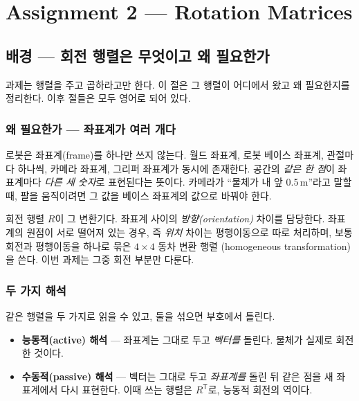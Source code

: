 \chapter{Assignment 2 --- Rotation Matrices}
\label{ch:hw2}


\section{배경 --- 회전 행렬은 무엇이고 왜 필요한가}
\label{sec:hw2-bg}

과제는 행렬을 주고 곱하라고만 한다. 이 절은 그 행렬이 어디에서 왔고 왜 필요한지를
정리한다. 이후 절들은 모두 영어로 되어 있다.

\subsection{왜 필요한가 --- 좌표계가 여러 개다}
\label{sec:hw2-bg-why}

로봇은 좌표계(frame)를 하나만 쓰지 않는다. 월드 좌표계, 로봇 베이스 좌표계, 관절마다
하나씩, 카메라 좌표계, 그리퍼 좌표계가 동시에 존재한다. 공간의 \emph{같은 한 점}이
좌표계마다 \emph{다른 세 숫자}로 표현된다는 뜻이다. 카메라가 ``물체가 내 앞
0.5\,m''라고 말할 때, 팔을 움직이려면 그 값을 베이스 좌표계의 값으로 바꿔야 한다.

회전 행렬 $R$이 그 변환기다. 좌표계 사이의 \emph{방향(orientation)} 차이를 담당한다.
좌표계의 원점이 서로 떨어져 있는 경우, 즉 \emph{위치} 차이는 평행이동으로 따로
처리하며, 보통 회전과 평행이동을 하나로 묶은 $4 \times 4$ 동차 변환 행렬
(homogeneous transformation)을 쓴다. 이번 과제는 그중 회전 부분만 다룬다.

\subsection{두 가지 해석}
\label{sec:hw2-bg-two}

같은 행렬을 두 가지로 읽을 수 있고, 둘을 섞으면 부호에서 틀린다.

\begin{itemize}
  \item \textbf{능동적(active) 해석} --- 좌표계는 그대로 두고 \emph{벡터를} 돌린다.
        물체가 실제로 회전한 것이다.
  \item \textbf{수동적(passive) 해석} --- 벡터는 그대로 두고 \emph{좌표계를} 돌린 뒤
        같은 점을 새 좌표계에서 다시 표현한다. 이때 쓰는 행렬은 $R^{\mathsf{T}}$로,
        능동적 회전의 역이다.
\end{itemize}

